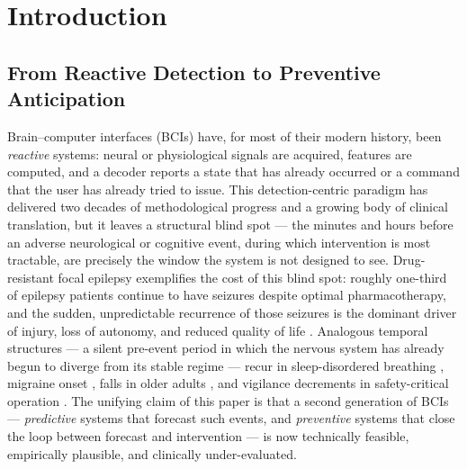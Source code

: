 
\section{Introduction}
\label{sec:introduction}

\subsection{From Reactive Detection to Preventive Anticipation}
\label{sec:intro-motivation}

Brain--computer interfaces (BCIs) have, for most of their modern history, been \emph{reactive} systems: neural or physiological signals are acquired, features are computed, and a decoder reports a state that has already occurred or a command that the user has already tried to issue. This detection-centric paradigm has delivered two decades of methodological progress and a growing body of clinical translation, but it leaves a structural blind spot --- the minutes and hours before an adverse neurological or cognitive event, during which intervention is most tractable, are precisely the window the system is not designed to see. Drug-resistant focal epilepsy exemplifies the cost of this blind spot: roughly one-third of epilepsy patients continue to have seizures despite optimal pharmacotherapy, and the sudden, unpredictable recurrence of those seizures is the dominant driver of injury, loss of autonomy, and reduced quality of life \cite{WesalEtAl2026,MalikEtAl2026}. Analogous temporal structures --- a silent pre-event period in which the nervous system has already begun to diverge from its stable regime --- recur in sleep-disordered breathing \cite{JamaraniEtAl2026}, migraine onset \cite{TomalinEtAl2025,KapustynskaEtAl2024,JankevičiūtėEtAl2026}, falls in older adults \cite{MaioraEtAl2024,ChanEtAl2023,Al-HammouriEtAl2025}, and vigilance decrements in safety-critical operation \cite{TheivadasPonnan2025,SchwarzEtAl2023,Al-QuraishiEtAl2024}. The unifying claim of this paper is that a second generation of BCIs --- \emph{predictive} systems that forecast such events, and \emph{preventive} systems that close the loop between forecast and intervention --- is now technically feasible, empirically plausible, and clinically under-evaluated.

